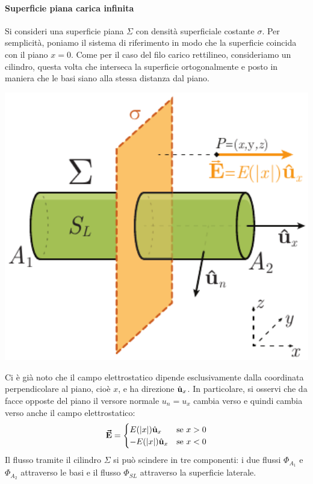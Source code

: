 \paragraph{Superficie piana carica infinita}
Si consideri una superficie piana $\Sigma$ con densità superficiale costante $\sigma$. Per semplicità, poniamo il sistema di riferimento in modo che la superficie coincida con il piano $x=0$. Come per il caso del filo carico rettilineo, consideriamo un cilindro, questa volta che interseca la superficie ortogonalmente e posto in maniera che le basi siano alla stessa distanza dal piano.\\
\begin{minipage}{0.43\textwidth}
	\begin{center}
		\includegraphics[width=1\textwidth]{images/chp2superficieinfinita.pdf}
	\end{center}		%
\end{minipage}\hspace{10pt}
\begin{minipage}{0.56\textwidth}
	Ci è già noto che il campo elettrostatico dipende esclusivamente dalla coordinata perpendicolare al piano, cioè $x$, e ha direzione $\hat{\mathbf{u}}_x$. In particolare, si osservi che da facce opposte del piano il versore normale $u_n=u_x$ cambia verso e quindi cambia verso anche il campo elettrostatico:
	\begin{equation*}
		\vb*{\va{E}}=
		\begin{cases}
			E(\abs{x})\hat{\mathbf{u}}_x&\text{se}\ x>0\\
			-E(\abs{x})\hat{\mathbf{u}}_x&\text{se}\ x<0
		\end{cases}
	\end{equation*}
	Il flusso tramite il cilindro $\Sigma$ si può scindere in tre componenti: i due flussi $\Phi_{A_1}$ e $\Phi_{A_2}$ attraverso le basi e il flusso $\Phi_{SL}$ attraverso la superficie laterale.
\end{minipage}\\
